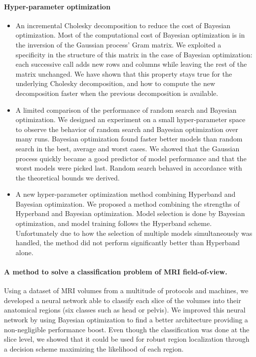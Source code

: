 \paragraph*{Hyper-parameter optimization}
\begin{itemize}
    \item An incremental Cholesky decomposition to reduce the cost of Bayesian optimization. Most of the computational cost of Bayesian optimization is in the inversion of the Gaussian process' Gram matrix. We exploited a specificity in the structure of this matrix in the case of Bayesian optimization: each successive call adds new rows and columns while leaving the rest of the matrix unchanged. We have shown that this property stays true for the underlying Cholesky decomposition, and how to compute the new decomposition faster when the previous decomposition is available.
    \item A limited comparison of the performance of random search and Bayesian optimization. We designed an experiment on a small hyper-parameter space to observe the behavior of random search and Bayesian optimization over many runs. Bayesian optimization found faster better models than random search in the best, average and worst cases. We showed that the Gaussian process quickly became a good predictor of model performance and that the worst models were picked last. Random search behaved in accordance with the theoretical bounds we derived. 
    \item A new hyper-parameter optimization method combining Hyperband and Bayesian optimization. We proposed a method combining the strengths of Hyperband and Bayesian optimization. Model selection is done by Bayesian optimization, and model training follows the Hyperband scheme. Unfortunately due to how the selection of multiple models simultaneously was handled, the method did not perform significantly better than Hyperband alone.
\end{itemize}

\paragraph*{A method to solve a classification problem of MRI field-of-view.}
Using a dataset of MRI volumes from a multitude of protocols and machines, we developed a neural network able to classify each slice of the volumes into their anatomical regions (six classes such as head or pelvis). We improved this neural network by using Bayesian optimization to find a better architecture providing a non-negligible performance boost. Even though the classification was done at the slice level, we showed that it could be used for robust region localization through a decision scheme maximizing the likelihood of each region.

